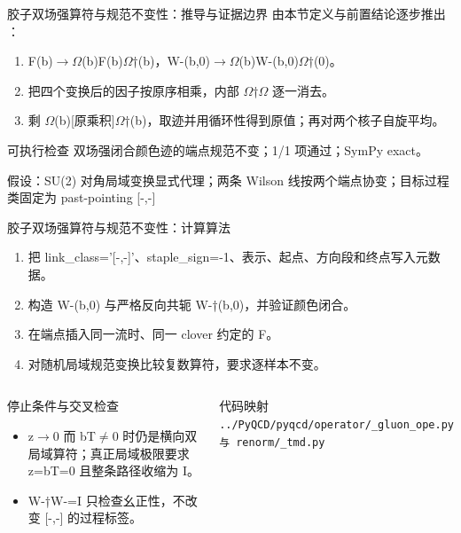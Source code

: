 \begin{frame}[t]{胶子双场强算符与规范不变性：推导与证据边界}
\footnotesize
{}\quad 由本节定义与前置结论逐步推出 ：
\begin{enumerate}
\item F(b)\ensuremath{\rightarrow}\ensuremath{\Omega}(b)F(b)\ensuremath{\Omega}†(b)，W-(b,0)\ensuremath{\rightarrow}\ensuremath{\Omega}(b)W-(b,0)\ensuremath{\Omega}†(0)。
\item 把四个变换后的因子按原序相乘，内部 \ensuremath{\Omega}†\ensuremath{\Omega} 逐一消去。
\item 剩 \ensuremath{\Omega}(b)[原乘积]\ensuremath{\Omega}†(b)，取迹并用循环性得到原值；再对两个核子自旋平均。
\end{enumerate}\begin{block}{可执行检查}
\quad 双场强闭合颜色迹的端点规范不变；1/1 项通过；SymPy exact。
\par\scriptsize 假设：SU(2) 对角局域变换显式代理；两条 Wilson 线按两个端点协变；目标过程类固定为 past-pointing [-,-]
\end{block}
\end{frame}

\begin{frame}[t]{胶子双场强算符与规范不变性：计算算法}
\footnotesize
{}\begin{enumerate}
\item 把 link\_class='[-,-]'、staple\_sign=-1、表示、起点、方向段和终点写入元数据。
\item 构造 W-(b,0) 与严格反向共轭 W-†(b,0)，并验证颜色闭合。
\item 在端点插入同一流时、同一 clover 约定的 F。
\item 对随机局域规范变换比较复数算符，要求逐样本不变。
\end{enumerate}\begin{columns}[T,onlytextwidth]
\begin{block}{停止条件与交叉检查}\scriptsize\begin{itemize}
\item[\CheckMark] z\ensuremath{\rightarrow}0 而 bT\ensuremath{\ne}0 时仍是横向双局域算符；真正局域极限要求 z=bT=0 且整条路径收缩为 I。
\item[\CheckMark] W-†W-=I 只检查幺正性，不改变 [-,-] 的过程标签。
\end{itemize}\end{block}
\begin{block}{代码映射}
\scriptsize \texttt{.\allowbreak{}.\allowbreak{}/\allowbreak{}PyQCD/\allowbreak{}pyqcd/\allowbreak{}operator/\allowbreak{}\_\allowbreak{}gluon\_\allowbreak{}ope.\allowbreak{}py 与 renorm/\allowbreak{}\_\allowbreak{}tmd.\allowbreak{}py}
\end{block}\end{columns}\end{frame}

